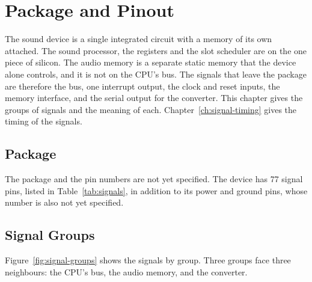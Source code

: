 \chapter{Package and Pinout}
\label{ch:package}

The sound device is a single integrated circuit with a memory of its own attached. The sound processor, the registers
and the slot scheduler are on the one piece of silicon. The audio memory is a separate static memory that the device
alone controls, and it is not on the CPU's bus. The signals that leave the package are therefore the bus, one interrupt
output, the clock and reset inputs, the memory interface, and the serial output for the converter. This chapter gives
the groups of signals and the meaning of each. Chapter~\ref{ch:signal-timing} gives the timing of the signals.

\section{Package}

The package and the pin numbers are not yet specified. The device has 77 signal pins, listed in
Table~\ref{tab:signals}, in addition to its power and ground pins, whose number is also not yet specified.

\section{Signal Groups}

Figure~\ref{fig:signal-groups} shows the signals by group. Three groups face three neighbours: the CPU's bus, the audio
memory, and the converter.

